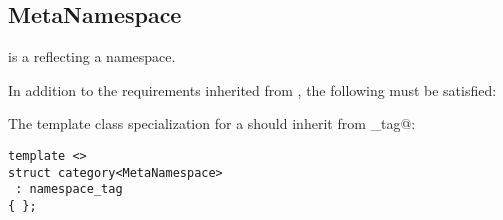 \subsection{MetaNamespace}
\label{concept-MetaNamespace}

 is a  reflecting a namespace.

In addition to the requirements inherited from , the following must
be satisfied:

The \verb@category@ template class specialization for a  should
inherit from \verb@namespace_tag@:

\begin{verbatim}
template <>
struct category<MetaNamespace>
 : namespace_tag
{ };
\end{verbatim}

